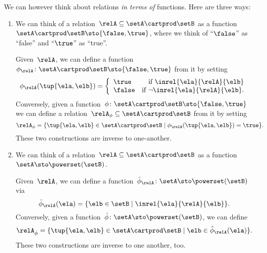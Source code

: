 \begin{remark}
    \label{re:rel-three-fun-descriptions}
    We can however think about relations \emph{in terms of} functions. Here are three ways:
    \begin{enumerate}
        \item We can think of a relation~$\relA \subseteq \setA \cartprod\setB$ as a function~$\setA \cartprod \setB \sto \{ \false, \true \}$, where we think of ``$\false$'' as ``false'' and ``$\true$'' as ``true''.

        Given~$\relA$, we can define a function~$\phi_{\relA} \colon \setA \cartprod \setB \sto \{ \false, \true \}$ from it by setting
        \begin{equation}
            \phi_{\relA}(\tup{\ela, \elb}) =
            \left
            \{\begin{array}{lr}
                  \true  & \text{if } \inrel{\ela}{\relA}{\elb}      \\
                  \false & \text{if } \neg\inrel{\ela}{\relA}{\elb}.
            \end{array}
            \right.
        \end{equation}
        Conversely, given a function~$\phi\colon \setA \cartprod \setB \sto \{ \false, \true \}$ we can define a relation~$\relA_{\phi} \subseteq \setA \cartprod \setB$ from it by setting
        \begin{equation}
            \relA_{\phi} = \{ \tup{\ela, \elb} \in \setA \cartprod \setB \mid \phi_{\relA}(\tup{\ela, \elb}) = \true \}.
        \end{equation}
        These two constructions are inverse to one-another.

        \item We can think of a relation~$\relA \subseteq \setA \cartprod \setB$ as a function~$\setA  \sto \powerset (\setB)$.

        Given~$\relA$, we can define a function~$\hat \phi_{\relA} \colon \setA \sto \powerset (\setB)$ via
        \begin{equation}
            \hat \phi_{\relA} (\ela) = \{ \elb \in \setB \mid \inrel{\ela}{\relA}{\elb}\}.
        \end{equation}
        Conversely, given a function~$\hat \phi \colon \setA \sto \powerset (\setB)$, we can define
        \begin{equation}
            \relA_{\hat \phi} = \{ \tup{\ela, \elb} \in \setA \cartprod \setB \mid \elb \in \hat \phi_{\relA}(\ela)   \}.
        \end{equation}
        These two constructions are inverse to one another, too.


\end{enumerate}
\end{remark}
